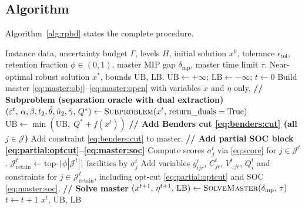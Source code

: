 \subsection{Algorithm}
\label{sec:rpbd:algorithm}

Algorithm~\ref{alg:rpbd} states the complete procedure.

\begin{algorithm}[t]
\caption{Partial-Block C\&CG (RPBD mode)}
\label{alg:rpbd}
\begin{algorithmic}[1]
\Require
  Instance data, uncertainty budget $\Gamma$, levels $H$,
  initial solution $x^0$, tolerance $\epsilon_{\mathrm{tol}}$,
  retention fraction $\phi\in(0,1)$,
  master MIP gap $\delta_{\mathrm{mp}}$, master time limit $\tau$.
\Ensure
  Near-optimal robust solution $x^*$, bounds $\mathrm{UB}$, $\mathrm{LB}$.
\State $\mathrm{UB} \leftarrow +\infty$; \;
       $\mathrm{LB} \leftarrow -\infty$; \;
       $t \leftarrow 0$
\State Build master \eqref{eq:master:obj}--\eqref{eq:master:open}
       with variables $x$ and $\eta$ only.
\Repeat
  \State \textbf{// Subproblem (separation oracle with dual extraction)}
  \State $(\bar\varepsilon^t,\, \alpha, \beta, t_2, \tilde\theta, \tilde u_2, \tilde\gamma,\, Q^*) \leftarrow
         \textsc{Subproblem}(x^t,\,\text{return\_duals}=\mathrm{True})$
  \State $\mathrm{UB} \leftarrow \min\!\left(\mathrm{UB},\;
         Q^* + f(x^t)\right)$
  \State \textbf{// Add Benders cut \eqref{eq:benders:cut} (all $j\in\mathcal{J}$)}
  \State Add constraint \eqref{eq:benders:cut} to master.
  \State \textbf{// Add partial SOC block \eqref{eq:partial:optcut}--\eqref{eq:master:soc}}
  \State Compute scores $\sigma_j^t$ via \eqref{eq:score} for
         $j\in\mathcal{J}^t$.
  \State $\mathcal{J}^t_{\mathrm{retain}} \leftarrow
         \text{top-}\lceil\phi|\mathcal{J}^t|\rceil
         \text{ facilities by } \sigma_j^t$
  \State Add variables $y^t_{ijr}$, $C^t_{jr}$, $V^t_{\cdot,jr}$,
         $Q^t_i$ and constraints for $j\in\mathcal{J}^t_{\mathrm{retain}}$,
         including opt-cut \eqref{eq:partial:optcut} and SOC
         \eqref{eq:master:soc}.
  \State \textbf{// Solve master}
  \State $(x^{t+1},\,\eta^{t+1},\,\mathrm{LB}) \leftarrow
         \textsc{SolveMaster}(\delta_{\mathrm{mp}},\,\tau)$
  \State $t \leftarrow t + 1$
\State \Return $x^t$, $\mathrm{UB}$, $\mathrm{LB}$
\end{algorithmic}
\end{algorithm}

